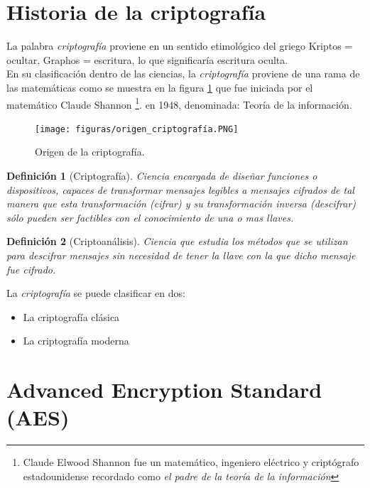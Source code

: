 \documentclass[peerreview]{IEEEtran}
\newtheorem{defin}{\textbf{Definición}}
\begin{document}
\section{Historia de la criptografía}
La palabra \textit{criptografía} proviene en un sentido etimológico  del griego
Kriptos = ocultar, Graphos = escritura, lo que significaría escritura oculta.\\

En su clasificación dentro de las ciencias, la \textit{criptografía} proviene
de una rama de las matemáticas como se muestra en la figura \ref{fig: 2} que
fue iniciada por el matemático Claude Shannon \footnote{Claude Elwood Shannon
  fue un matemático, ingeniero eléctrico y criptógrafo estadounidense recordado
  como \textit{el padre de la teoría de la información}}. en 1948, denominada:
Teoría de la información.\\

\begin{figure}[h]
  \centering
  \texttt{[image: figuras/origen\_criptografía.PNG]}
  \caption{Origen de la criptografía.}
  \label{fig: 2}
\end{figure}

\begin{defin}[Criptografía]
  Ciencia encargada de diseñar funciones o dispositivos, capaces de transformar
  mensajes legibles a mensajes cifrados de tal manera que esta transformación
  (cifrar) y su transformación inversa (descifrar) sólo pueden ser factibles con
  el conocimiento de una o mas llaves.\\
  
\end{defin}

\begin{defin}[Criptoanálisis]
	Ciencia que estudia los métodos que se utilizan para descifrar mensajes sin necesidad de tener la llave con la que dicho mensaje fue cifrado.\\
	
\end{defin}
La \textit{criptografía} se puede clasificar en dos: \begin{itemize}
  \item La criptografía clásica
  \item La criptografía moderna
\end{itemize}


\section{Advanced Encryption Standard (AES)}
\end{document}
